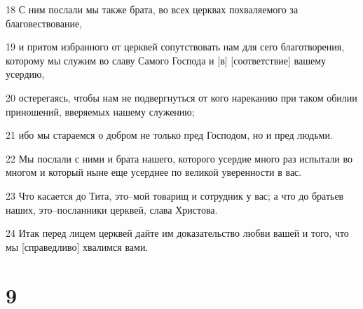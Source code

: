 \par 18 С ним послали мы также брата, во всех церквах похваляемого за благовествование,
\par 19 и притом избранного от церквей сопутствовать нам для сего благотворения, которому мы служим во славу Самого Господа и [в] [соответствие] вашему усердию,
\par 20 остерегаясь, чтобы нам не подвергнуться от кого нареканию при таком обилии приношений, вверяемых нашему служению;
\par 21 ибо мы стараемся о добром не только пред Господом, но и пред людьми.
\par 22 Мы послали с ними и брата нашего, которого усердие много раз испытали во многом и который ныне еще усерднее по великой уверенности в вас.
\par 23 Что касается до Тита, это--мой товарищ и сотрудник у вас; а что до братьев наших, это--посланники церквей, слава Христова.
\par 24 Итак перед лицем церквей дайте им доказательство любви вашей и того, что мы [справедливо] хвалимся вами.

\chapter{9}

